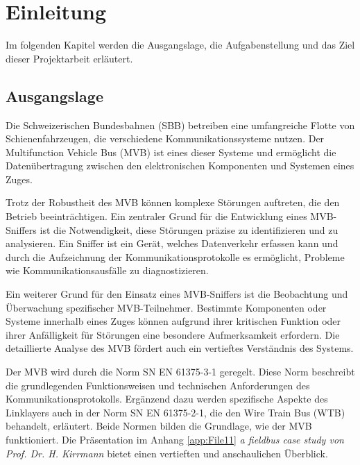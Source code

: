 

\chapter{Einleitung} %
\label{Einleitung}
Im folgenden Kapitel werden die Ausgangslage, die Aufgabenstellung und das Ziel dieser Projektarbeit erläutert.

\section{Ausgangslage} %
\label{Ausgangslage} %


Die Schweizerischen Bundesbahnen (SBB) betreiben eine umfangreiche Flotte von Schienenfahrzeugen, die verschiedene Kommunikationssysteme nutzen. Der Multifunction Vehicle Bus (MVB) ist eines dieser Systeme und ermöglicht die Datenübertragung zwischen den elektronischen Komponenten und Systemen eines Zuges.

Trotz der Robustheit des MVB können komplexe Störungen auftreten, die den Betrieb beeinträchtigen. Ein zentraler Grund für die Entwicklung eines MVB-Sniffers ist die Notwendigkeit, diese Störungen präzise zu identifizieren und zu analysieren. Ein Sniffer ist ein Gerät, welches Datenverkehr erfassen kann und durch die Aufzeichnung der Kommunikationsprotokolle es ermöglicht, Probleme wie Kommunikationsausfälle zu diagnostizieren.

Ein weiterer Grund für den Einsatz eines MVB-Sniffers ist die Beobachtung und Überwachung spezifischer MVB-Teilnehmer. Bestimmte Komponenten oder Systeme innerhalb eines Zuges können aufgrund ihrer kritischen Funktion oder ihrer Anfälligkeit für Störungen eine besondere Aufmerksamkeit erfordern. Die detaillierte Analyse des MVB fördert auch ein vertieftes Verständnis des Systems.

Der MVB wird durch die Norm SN EN 61375-3-1 geregelt. Diese Norm beschreibt die grundlegenden Funktionsweisen und technischen Anforderungen des Kommunikationsprotokolls. Ergänzend dazu werden spezifische Aspekte des Linklayers auch in der Norm SN EN 61375-2-1, die den Wire Train Bus (WTB) behandelt, erläutert. Beide Normen bilden die Grundlage, wie der MVB funktioniert. Die Präsentation im Anhang \ref{app:File11} \textit{a fieldbus case study von Prof. Dr. H. Kirrmann} bietet einen vertieften und anschaulichen Überblick.
\newpage


